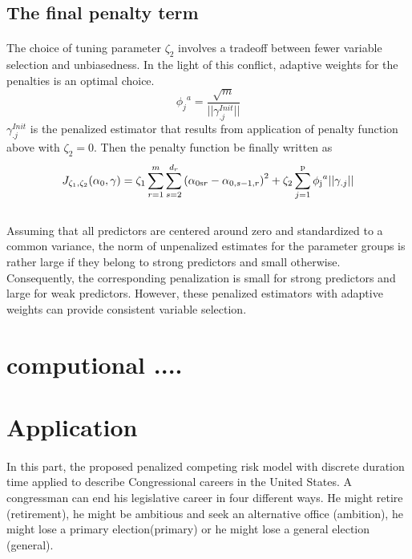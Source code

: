 \documentclass[]{article}
\begin{document}
    \subsection{The final penalty term}
    \paragraph{}
    The choice of tuning parameter $\zeta_2 $ involves a tradeoff between fewer variable selection and unbiasedness. In the light of this conflict, adaptive weights for the penalties is an optimal choice.
    \begin{equation}
    {\phi _j}^a = \frac{{\sqrt m }}{{||\gamma _{.j}^{Init}||}}
    \end{equation}
    $\gamma _{.j}^{Init}$ is the penalized estimator that results from application of penalty function above with $\zeta_2 = 0$.
    Then the penalty function be finally written as
    \begin{equation}
    {J_{{\zeta _1},{\zeta _2}}}({\alpha _0},\gamma ) = {\zeta _1}\sum\limits_{r = 1}^m {\sum\limits_{s = 2}^{{d_r}} {{{({\alpha _{0{\rm{s}}r}} - {\alpha _{0,s - 1,r}})}^2}} }  + {\zeta _2}\sum\limits_{j = 1}^{\rm{p}} {{\phi _{\rm{j}}}^a||{\gamma _{.j}}||}
    \end{equation}\\
    
    Assuming that all predictors are centered around zero and standardized to a common variance, the norm of unpenalized estimates for the parameter groups is rather large if they belong to strong predictors and small otherwise. Consequently, the corresponding penalization is small for strong predictors and large for weak predictors. However, these penalized estimators with adaptive weights can  provide consistent variable selection.
    \section{computional ....}%
    
    \section{Application}
        \paragraph{}In this part, the proposed penalized competing risk model with discrete duration time applied to describe Congressional careers in the United States. A congressman can end his legislative career in four different ways. He might retire (retirement), he might be ambitious and seek an alternative office (ambition), he might lose a primary election(primary) or he might lose a general election (general).
\end{document}

